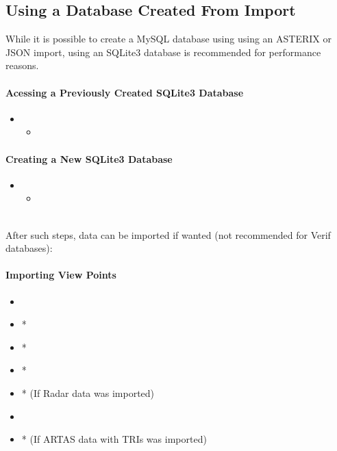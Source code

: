 \subsection{Using a Database Created From Import}

While it is possible to create a MySQL database using using an ASTERIX or JSON import, using an SQLite3 database is recommended for performance reasons.

\paragraph{Acessing a Previously Created SQLite3 Database} 

\begin{itemize}
\item {}
\begin{itemize}
 \item {}
 \end{itemize}
 \end{itemize}

\paragraph{Creating a New SQLite3 Database}

\begin{itemize}
\item {}
\begin{itemize}
 \item {}
\end{itemize}
\end{itemize}
\ \\

After such steps, data can be imported if wanted (not recommended for Verif databases):

\paragraph{Importing View Points} 

\begin{itemize}
 \item {}
 \item {}*
 \item {}*
 \item {}*
 \item {}* (If Radar data was imported)
 \item {}
 \item {}* (If ARTAS data with TRIs was imported)
\end{itemize}

